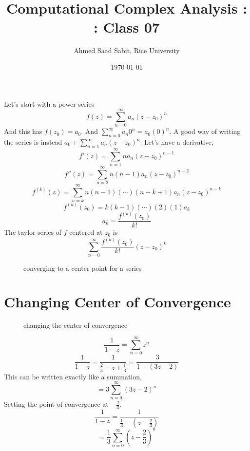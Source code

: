 \documentclass[letter]{article}
\title{Computational Complex Analysis : : Class 07}
\author{Ahmed Saad Sabit, Rice University}
\date{\today}
\begin{document}
	\maketitle
	 Let's start with a power series 
	 \[
	 f(z) = \sum_{n=0}^{\infty} a_n (z - z_0)^{n}
	 \] 
	 And this has $f(z_0)=a_0$. And $\sum_{n=0}^{\infty} a_n 0^{n} = a_0 (0)^{n}.$ 
	 A good way of writing the series is instead $a_0 + \sum_{n=1}^{\infty} a_n(z-z_0)^{n}$. 
	 Let's have a derivative, 
	 \[
	 f'(z) = \sum_{n=1}^{\infty} na_n (z-z_0)^{n-1}
	 \] 
	 \[
	 f''(z) = \sum_{n=2}^{\infty} n(n-1)a_n (z-z_0)^{n-2}
	 \] 
	 \[
	 f^{(k)}(z) = \sum_{n=k}^{\infty} n (n-1) (\cdots) (n-k+1) a_n (z-z_0)^{n-k}
	 \]
	 \[
	 f^{(k)}(z_0) = k (k-1)(\cdots)(2)(1) a_k
	 \] 
	 \[
		 a_k = \frac{f^{(k)}(z_0)}{k!}
	 \] 
	 The taylor series of $f$ centered at $z_0$ is
	 \[
	 \sum_{n=0}^{\infty} \frac{f^{(k)}(z_0)}{k!}(z-z_0)^{k}
	 \] 


\begin{figure}[ht]
    \centering
    \caption{converging to a center point for a series}
    \label{fig:converging-to-a-center-point-for-a-series}
\end{figure}

	\section{Changing Center of Convergence} 
\begin{figure}[h]
    \centering
    \caption{changing the center of convergence}
    \label{fig:changing-the-center-of-convergence}
\end{figure}
	\[
	\frac{1}{1-z} = \sum_{n=0}^{\infty} z^{n}
	\] 
	\[
	\frac{1}{1-z} = \frac{1}{\frac{2}{3} - z + \frac{1}{3}} = \frac{3}{1 - \left(3z - 2\right)}
	\] 
	This can be written exactly like a summation,
	\[
	= 3 \sum_{n=0}^{\infty} (3z - 2)^{n}
	\]
	Setting the point of convergence at $-\frac{2}{3}$. 
	\[
	\frac{1}{1-z} = \frac{1}{\frac{1}{3} - (z- \frac{2}{3})}
	\]\[
	=\frac{1}{3} \sum_{n=0}^{\infty} \left(z- \frac{2}{3}\right)^{n}
	\]  
\end{document}
